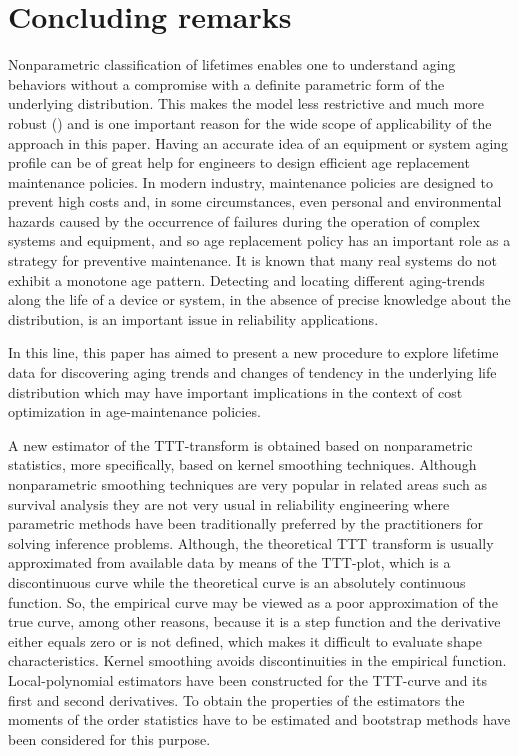 \documentclass[preprint,12pt]{elsarticle}
\begin{document}
\section{Concluding remarks}


Nonparametric classification of lifetimes enables one to understand aging behaviors without a compromise with a definite parametric form of the underlying distribution. This makes the model less restrictive and much more robust (\cite{KM2019}) and is one important reason for the wide scope of applicability of the approach in this paper. 
Having an accurate idea of ​​an equipment or system aging profile can be of great help for engineers to design efficient age replacement maintenance policies. In modern industry, maintenance policies are designed to prevent high costs and, in some circumstances, even personal and environmental hazards caused by the occurrence of failures during the operation of complex systems and equipment, and so age replacement policy has an important role as a strategy for preventive maintenance.
 It is known that many real systems do not exhibit a monotone age pattern. Detecting and locating  different aging-trends along the life of a device or system, in the absence of precise knowledge about the distribution, is an important issue in reliability applications. 

In this line, this paper has aimed to present a new procedure to explore lifetime data for discovering aging trends and changes of tendency in the underlying life distribution which may have important implications in the context of cost optimization in age-maintenance policies.


A new estimator of the TTT-transform is obtained based on nonparametric statistics, more specifically, based on kernel smoothing techniques. Although nonparametric smoothing techniques are very popular in related areas such as survival analysis they are not very usual in reliability engineering where parametric methods have been traditionally preferred by the practitioners for solving inference problems. 
Although, the theoretical TTT transform is usually approximated from available data by means of the TTT-plot, which is a discontinuous curve while the theoretical curve is an absolutely continuous function. So, the empirical curve may be viewed as a poor approximation of the true curve, among other reasons, because it is a step function and the derivative either equals zero or is not defined, which makes it difficult to evaluate shape characteristics. Kernel smoothing avoids discontinuities in the empirical function.
Local-polynomial estimators have been constructed for the TTT-curve and its first and second derivatives. To obtain the properties of the estimators the moments of the order statistics have to be estimated and bootstrap methods have been considered for this purpose.
\end{document}
